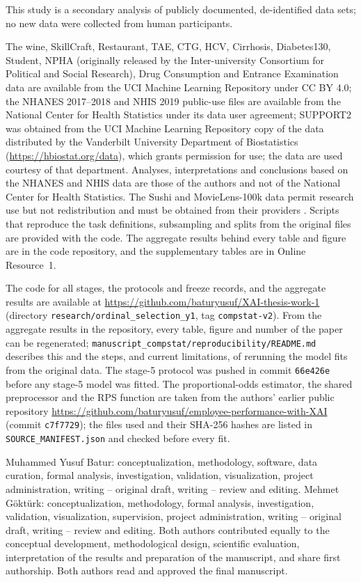 \documentclass[pdflatex,sn-mathphys-ay]{sn-jnl}
\theoremstyle{thmstyleone}
\theoremstyle{thmstylethree}
\begin{document}
 This study is a secondary analysis of publicly documented, de-identified data sets; no new data were collected from human participants.

 The wine, SkillCraft, Restaurant, TAE, CTG, HCV, Cirrhosis, Diabetes130, Student, NPHA (originally released by the Inter-university Consortium for Political and Social Research), Drug Consumption and Entrance Examination data are available from the UCI Machine Learning Repository under CC BY 4.0; the NHANES 2017--2018 and NHIS 2019 public-use files are available from the National Center for Health Statistics under its data user agreement; SUPPORT2 was obtained from the UCI Machine Learning Repository copy of the data distributed by the Vanderbilt University Department of Biostatistics (\url{https://hbiostat.org/data}), which grants permission for use; the data are used courtesy of that department. Analyses, interpretations and conclusions based on the NHANES and NHIS data are those of the authors and not of the National Center for Health Statistics. The Sushi and MovieLens-100k data permit research use but not redistribution and must be obtained from their providers \citep{Kamishima2003,Harper2015}. Scripts that reproduce the task definitions, subsampling and splits from the original files are provided with the code. The aggregate results behind every table and figure are in the code repository, and the supplementary tables are in Online Resource~1.

 The code for all stages, the protocols and freeze records, and the aggregate results are available at \url{https://github.com/baturyusuf/XAI-thesis-work-1} (directory \texttt{research/ordinal\_selection\_y1}, tag \texttt{compstat-v2}). From the aggregate results in the repository, every table, figure and number of the paper can be regenerated; \texttt{manuscript\_compstat/reproducibility/README.md} describes this and the steps, and current limitations, of rerunning the model fits from the original data. The stage-5 protocol was pushed in commit \texttt{66e426e} before any stage-5 model was fitted. The proportional-odds estimator, the shared preprocessor and the RPS function are taken from the authors' earlier public repository \url{https://github.com/baturyusuf/employee-performance-with-XAI} (commit \texttt{c7f7729}); the files used and their SHA-256 hashes are listed in \texttt{SOURCE\_MANIFEST.json} and checked before every fit.

 Muhammed Yusuf Batur: conceptualization, methodology, software, data curation, formal analysis, investigation, validation, visualization, project administration, writing -- original draft, writing -- review and editing. Mehmet G\"{o}kt\"{u}rk: conceptualization, methodology, formal analysis, investigation, validation, visualization, supervision, project administration, writing -- original draft, writing -- review and editing. Both authors contributed equally to the conceptual development, methodological design, scientific evaluation, interpretation of the results and preparation of the manuscript, and share first authorship. Both authors read and approved the final manuscript.


\end{document}
